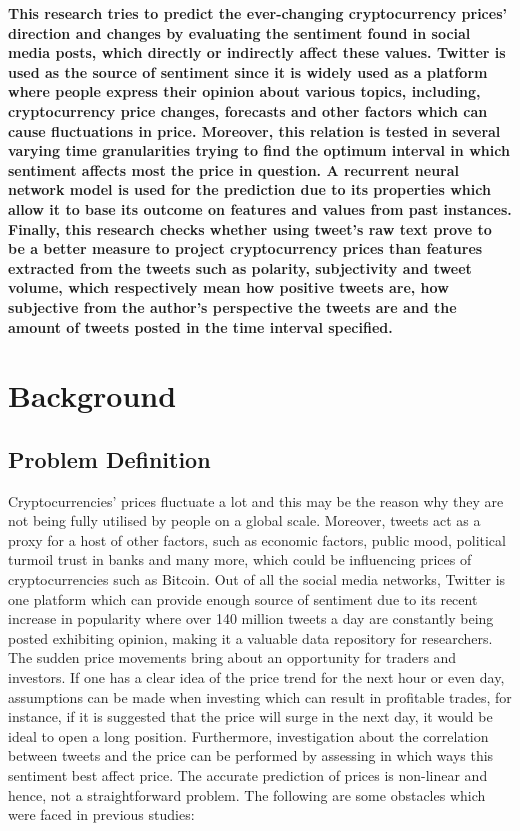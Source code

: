 \documentclass{article}
\begin{document}
	\textbf{This research tries to predict the ever-changing cryptocurrency prices' direction and changes by evaluating the sentiment found in social media posts, which directly or indirectly affect these values. Twitter is used as the source of sentiment since it is widely used as a platform where people express their opinion about various topics, including, cryptocurrency price changes, forecasts and other factors which can cause fluctuations in price. Moreover, this relation is tested in several varying time granularities trying to find the optimum interval in which sentiment affects most the price in question. A recurrent neural network model is used for the prediction due to its properties which allow it to base its outcome on features and values from past instances. Finally, this research checks whether using tweet's raw text prove to be a better measure to project cryptocurrency prices than features extracted from the tweets such as polarity, subjectivity and tweet volume, which respectively mean how positive tweets are, how subjective from the author's perspective the tweets are and the amount of tweets posted in the time interval specified. }
	
	
	\section{Background}
	
	\subsection{Problem Definition}
	
	Cryptocurrencies' prices fluctuate a lot and this may be the reason why they are not being fully utilised by people on a global scale\cite{hh}. Moreover, tweets act as a proxy for a host of other factors, such as economic factors, public mood, political turmoil trust in banks and many more, which could be influencing prices of cryptocurrencies such as Bitcoin\cite{sapp1}. Out of all the social media networks, Twitter is one platform which can provide enough source of sentiment due to its recent increase in popularity where over 140 million tweets a day are constantly being posted exhibiting opinion, making it a valuable data repository for researchers\cite{sapp2}. The sudden price movements bring about an opportunity for traders and investors. If one has a clear idea of the price trend for the next hour or even day, assumptions can be made when investing which can result in profitable trades, for instance, if it is suggested that the price will surge in the next day, it would be ideal to open a long position\cite{longpos}. Furthermore, investigation about the correlation between tweets and the price can be performed by assessing in which ways this sentiment best affect price. 
The accurate prediction of prices is non-linear and hence, not a straightforward problem\cite{sapp7}. The following are some obstacles which were faced in previous studies: 
\end{document}
